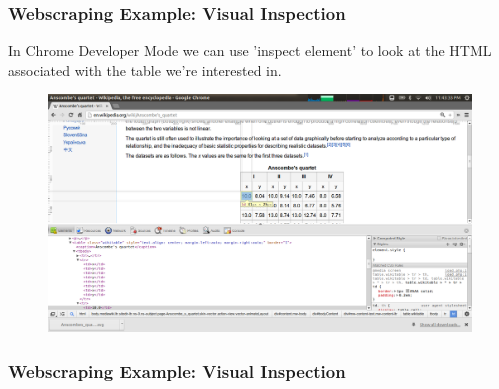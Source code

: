 \documentclass{beamer}
\begin{document}
\begin{frame}
\frametitle{Webscraping Example: Visual Inspection}
In Chrome Developer Mode we can use 'inspect element' to look at the HTML associated with the table we're interested in.

\begin{figure}[h]
\centering
\includegraphics[width=.9\textwidth]{images/chrome_devel.png}
\end{figure}
\end{frame}


\begin{frame}
\frametitle{Webscraping Example: Visual Inspection}
\lstset{basicstyle=\tiny}
\end{frame}
\end{document}
